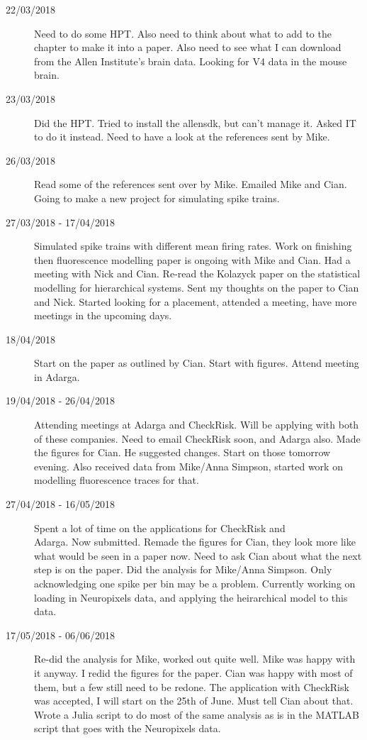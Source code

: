 \documentclass[a4paper,12pt]{article}
\theoremstyle{definition}
\begin{document}
\begin{description}
	\item[22/03/2018] Need to do some HPT. Also need to think about what to add to the chapter to make it into a paper. Also need to see what I can download from the Allen Institute's brain data. Looking for V4 data in the mouse brain.

	\item[23/03/2018] Did the HPT. Tried to install the allensdk, but can't manage it. Asked IT to do it instead. Need to have a look at the references sent by Mike.

	\item[26/03/2018] Read some of the references sent over by Mike. Emailed Mike and Cian. Going to make a new project for simulating spike trains.

	\item[27/03/2018 - 17/04/2018] Simulated spike trains with different mean firing rates. Work on finishing then fluorescence modelling paper is ongoing with Mike and Cian. Had a meeting with Nick and Cian. Re-read the Kolazyck paper on the statistical modelling for hierarchical systems. Sent my thoughts on the paper to Cian and Nick. Started looking for a placement, attended a meeting, have more meetings in the upcoming days.

	\item[18/04/2018] Start on the paper as outlined by Cian. Start with figures. Attend meeting in Adarga.

	\item[19/04/2018 - 26/04/2018] Attending meetings at Adarga and CheckRisk. Will be applying with both of these companies. Need to email CheckRisk soon, and Adarga also. Made the figures for Cian. He suggested changes. Start on those tomorrow evening. Also received data from Mike/Anna Simpson, started work on modelling fluorescence traces for that.

	\item[27/04/2018 - 16/05/2018] Spent a lot of time on the applications for CheckRisk and \\ Adarga. Now submitted. Remade the figures for Cian, they look more like what would be seen in a paper now. Need to ask Cian about what the next step is on the paper. Did the analysis for Mike/Anna Simpson. Only acknowledging one spike per bin may be a problem. Currently working on loading in Neuropixels data, and applying the heirarchical model to this data.

	\item[17/05/2018 - 06/06/2018] Re-did the analysis for Mike, worked out quite well. Mike was happy with it anyway. I redid the figures for the paper. Cian was happy with most of them, but a few still need to be redone. The application with CheckRisk was accepted, I will start on the 25th of June. Must tell Cian about that. Wrote a Julia script to do most of the same analysis as is in the MATLAB script that goes with the Neuropixels data.


\end{description}
\end{document}
